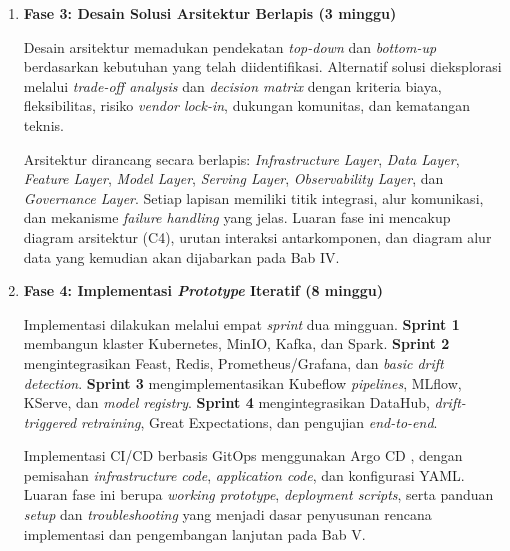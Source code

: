 \begin{enumerate}
    \vspace{0.5em}

    \item \textbf{Fase 3: Desain Solusi Arsitektur Berlapis (3 minggu)}
    
    Desain arsitektur memadukan pendekatan \textit{top-down} dan \textit{bottom-up} berdasarkan kebutuhan yang telah diidentifikasi. Alternatif solusi dieksplorasi melalui \textit{trade-off analysis} dan \textit{decision matrix} dengan kriteria biaya, fleksibilitas, risiko \textit{vendor lock-in}, dukungan komunitas, dan kematangan teknis.
    
    \vspace{0.5em}

    Arsitektur dirancang secara berlapis: \textit{Infrastructure Layer}, \textit{Data Layer}, \textit{Feature Layer}, \textit{Model Layer}, \textit{Serving Layer}, \textit{Observability Layer}, dan \textit{Governance Layer}. Setiap lapisan memiliki titik integrasi, alur komunikasi, dan mekanisme \textit{failure handling} yang jelas. Luaran fase ini mencakup diagram arsitektur (C4), urutan interaksi antarkomponen, dan diagram alur data yang kemudian akan dijabarkan pada Bab IV.
    
    \vspace{0.5em}
    
    \item \textbf{Fase 4: Implementasi \textit{Prototype} Iteratif (8 minggu)}
    
    Implementasi dilakukan melalui empat \textit{sprint} dua mingguan. \textbf{Sprint 1} membangun klaster Kubernetes, MinIO, Kafka, dan Spark. \textbf{Sprint 2} mengintegrasikan Feast, Redis, Prometheus/Grafana, dan \textit{basic drift detection}. \textbf{Sprint 3} mengimplementasikan Kubeflow \textit{pipelines}, MLflow, KServe, dan \textit{model registry}. \textbf{Sprint 4} mengintegrasikan DataHub, \textit{drift-triggered retraining}, Great Expectations, dan pengujian \textit{end-to-end}.
    
    \vspace{0.5em}

    Implementasi CI/CD berbasis GitOps menggunakan Argo CD \autocite{argocd2024}, dengan pemisahan \textit{infrastructure code}, \textit{application code}, dan konfigurasi YAML. Luaran fase ini berupa \textit{working prototype}, \textit{deployment scripts}, serta panduan \textit{setup} dan \textit{troubleshooting} yang menjadi dasar penyusunan rencana implementasi dan pengembangan lanjutan pada Bab V.
    

\end{enumerate}
